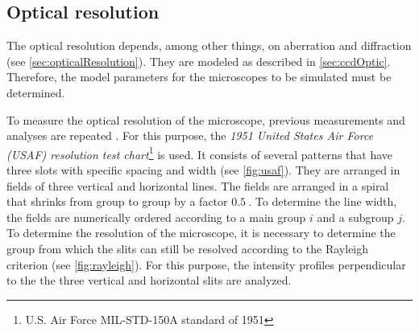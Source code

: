 \subsection{Optical resolution}
%
The optical resolution depends, among other things, on aberration and diffraction (see \cref{sec:opticalResolution}).
They are modeled as described in \cref{sec:ccdOptic}.
Therefore, the model parameters for the microscopes to be simulated must be determined.
\par
%
To measure the optical resolution of the microscope, previous measurements and analyses are repeated \cite{MenzelMaster}.
For this purpose, the \textit{1951 United States Air Force (USAF) resolution test chart}\footnote{U.S. Air Force MIL-STD-150A standard of 1951} is used.
It consists of several patterns that have three slots with specific spacing and width (see \cref{fig:usaf}).
They are arranged in fields of three vertical and horizontal lines.
The fields are arranged in a spiral that shrinks from group to group by a factor $\SI{0.5}{}$.
To determine the line width, the fields are numerically ordered according to a main group $i$ and a subgroup $j$.
To determine the resolution of the microscope, it is necessary to determine the group from which the slits can still be resolved according to the Rayleigh criterion (see \cref{fig:rayleigh}).
For this purpose, the intensity profiles perpendicular to the the three vertical and horizontal slits are analyzed.
% 
